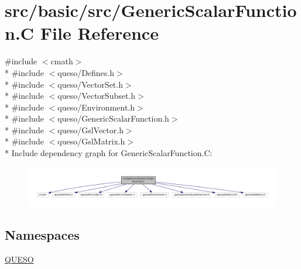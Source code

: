 \hypertarget{_generic_scalar_function_8_c}{\section{src/basic/src/\-Generic\-Scalar\-Function.C File Reference}
\label{_generic_scalar_function_8_c}
}
{\ttfamily \#include $<$cmath$>$}\\*
{\ttfamily \#include $<$queso/\-Defines.\-h$>$}\\*
{\ttfamily \#include $<$queso/\-Vector\-Set.\-h$>$}\\*
{\ttfamily \#include $<$queso/\-Vector\-Subset.\-h$>$}\\*
{\ttfamily \#include $<$queso/\-Environment.\-h$>$}\\*
{\ttfamily \#include $<$queso/\-Generic\-Scalar\-Function.\-h$>$}\\*
{\ttfamily \#include $<$queso/\-Gsl\-Vector.\-h$>$}\\*
{\ttfamily \#include $<$queso/\-Gsl\-Matrix.\-h$>$}\\*
Include dependency graph for Generic\-Scalar\-Function.\-C\-:
\nopagebreak
\begin{figure}[H]
\begin{center}
\leavevmode
\includegraphics[width=350pt]{_generic_scalar_function_8_c__incl}
\end{center}
\end{figure}
\subsection*{Namespaces}
\begin{DoxyCompactItemize}
\item 
\hyperlink{namespace_q_u_e_s_o}{Q\-U\-E\-S\-O}
\end{DoxyCompactItemize}
